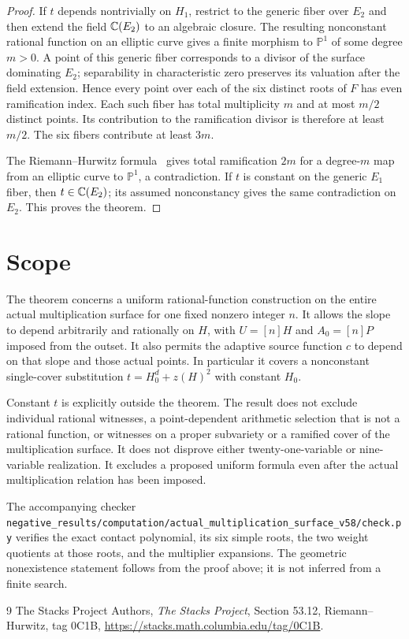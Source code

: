 \documentclass[11pt,a4paper]{article}
\begin{document}
\begin{proof}
If $t$ depends nontrivially on $H_1$, restrict to the generic
fiber over $E_2$ and then extend the field $\mathbb C(E_2)$ to an algebraic
closure. The resulting nonconstant rational function on an elliptic
curve gives a finite morphism to $\mathbb P^1$ of some degree $m>0$.
A point of this generic fiber corresponds to a divisor of the surface
dominating $E_2$; separability in characteristic zero preserves its
valuation after the field extension. Hence every point over each of
the six distinct roots of $F$ has even ramification index. Each such
fiber has total multiplicity $m$ and at most $m/2$ distinct points.
Its contribution to the ramification divisor is therefore at least
$m/2$. The six fibers contribute at least $3m$.

The Riemann--Hurwitz formula~\cite{RH} gives total ramification $2m$ for a
degree-$m$ map from an elliptic curve to $\mathbb P^1$, a contradiction.
If $t$ is constant on the generic $E_1$ fiber, then
$t\in\mathbb C(E_2)$; its assumed nonconstancy gives the same contradiction
on $E_2$. This proves the theorem.
\end{proof}

\section*{Scope}

The theorem concerns a uniform rational-function construction on the
entire actual multiplication surface for one fixed nonzero integer
$n$. It allows the slope to depend arbitrarily and rationally on
$H$, with $U=[n]H$ and $A_0=[n]P$ imposed from the outset.
It also permits the adaptive source function $c$ to depend on that
slope and those actual points. In particular it covers a nonconstant
single-cover substitution $t=H_0^d+z(H)^2$ with constant $H_0$.

Constant $t$ is explicitly outside the theorem. The result does not
exclude individual rational witnesses, a point-dependent arithmetic
selection that is not a rational function, or witnesses on a proper
subvariety or a ramified cover of the multiplication surface. It
does not disprove either twenty-one-variable or nine-variable
realization. It excludes a proposed uniform formula even after the
actual multiplication relation has been imposed.

The accompanying checker
\nolinkurl{negative_results/computation/actual_multiplication_surface_v58/check.py}
verifies the exact contact polynomial, its six simple roots, the two
weight quotients at those roots, and the multiplier expansions.
The geometric nonexistence statement follows from the proof above;
it is not inferred from a finite search.

\begin{thebibliography}{9}
The Stacks Project Authors, \emph{The Stacks Project},
Section 53.12, Riemann--Hurwitz, tag 0C1B,
\url{https://stacks.math.columbia.edu/tag/0C1B}.
\end{thebibliography}
\end{document}

